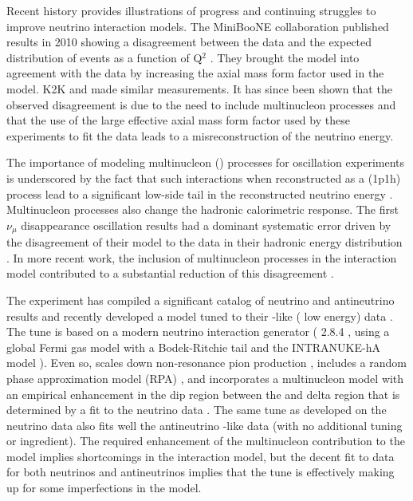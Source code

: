 Recent history provides illustrations of progress and continuing struggles to improve neutrino interaction models.  The MiniBooNE collaboration published results in 2010 showing a disagreement between the data and the expected distribution of  events as a function of Q$^{2}$ \cite{AguilarArevalo:2010cx,Gran:2006jn}.   They brought the model into agreement with the data by increasing the axial mass form factor used in the model.  K2K \cite{Gran:2006jn} and  \cite{Adamson:2014pgc} made similar measurements.  It has since been shown that the observed disagreement is due to the need to include multinucleon processes and that the use of the large effective axial mass form factor used by these experiments to fit the data leads to a misreconstruction of the neutrino energy.  

The importance of modeling multinucleon () processes for oscillation experiments is underscored by the fact that such interactions when reconstructed as a  (1p1h) process lead to a significant low-side tail in the reconstructed neutrino energy \cite{Martini:2012uc}.  Multinucleon processes also change the hadronic calorimetric response.  The first    $\nu_{\mu}$ disappearance oscillation results had a dominant systematic error driven by the disagreement of their model to the data in their hadronic energy distribution \cite{Adamson:2016xxw}.  In more recent work, the inclusion of multinucleon processes in the interaction model contributed to a substantial reduction of this disagreement \cite{NOvA:2018gge}.

The  experiment has compiled a significant catalog of neutrino and antineutrino results and recently developed a model tuned to their -like  ( low energy) data \cite{Ruterbories:2018gub}.  The tune is based on a modern neutrino interaction generator ( 2.8.4 \cite{Andreopoulos:2009rq}, using a global Fermi gas model \cite{Smith:1972xh}  with a Bodek-Ritchie tail \cite{Bodek:1981wr} and the INTRANUKE-hA  model \cite{Dytman:2007zz}).  Even so,  scales down non-resonance pion production \cite{Rodrigues:2016xjj}, includes a random phase approximation model (RPA) \cite{Nieves:2004wx,Gran:2017psn}, and incorporates a multinucleon model \cite{Nieves:2011pp, Gran:2013kda, Schwehr:2016pvn} with an empirical enhancement in the dip region between the  and delta region that is determined by a fit to the neutrino data \cite{Ruterbories:2018gub}.  The same tune as developed on the neutrino data also fits well the  antineutrino -like data (with no additional tuning or ingredient).  The required enhancement of the multinucleon contribution to the model implies shortcomings in the interaction model, but the decent fit to data for both neutrinos and antineutrinos implies that the tune is effectively making up for some imperfections in the model. 

